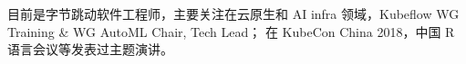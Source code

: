 

\begin{cvparagraph}
\begin{minipage}[t]{\textwidth}
目前是字节跳动软件工程师，主要关注在云原生和 AI infra 领域，Kubeflow WG Training \& WG AutoML Chair, Tech Lead；
在 KubeCon China 2018，中国 R 语言会议等发表过主题演讲。
\end{minipage}
\end{cvparagraph}
